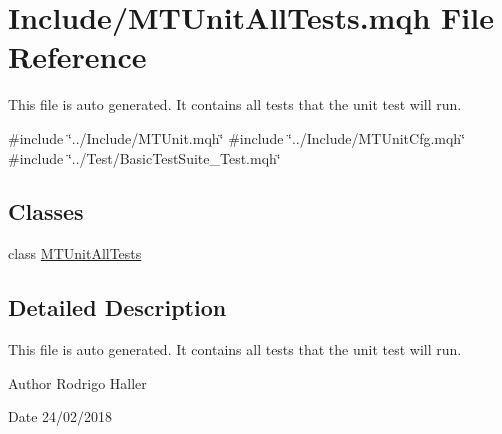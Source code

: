 \hypertarget{_m_t_unit_all_tests_8mqh}{}\section{Include/\+M\+T\+Unit\+All\+Tests.mqh File Reference}
\label{_m_t_unit_all_tests_8mqh}


This file is auto generated. It contains all tests that the unit test will run.  


{\ttfamily \#include \char`\"{}../\+Include/\+M\+T\+Unit.\+mqh\char`\"{}}\newline
{\ttfamily \#include \char`\"{}../\+Include/\+M\+T\+Unit\+Cfg.\+mqh\char`\"{}}\newline
{\ttfamily \#include \char`\"{}../\+Test/\+Basic\+Test\+Suite\+\_\+\+Test.\+mqh\char`\"{}}\newline
\subsection*{Classes}
\begin{DoxyCompactItemize}
\item 
class \mbox{\hyperlink{class_m_t_unit_all_tests}{M\+T\+Unit\+All\+Tests}}
\end{DoxyCompactItemize}


\subsection{Detailed Description}
This file is auto generated. It contains all tests that the unit test will run. 

\begin{DoxyAuthor}{Author}
Rodrigo Haller 
\end{DoxyAuthor}
\begin{DoxyDate}{Date}
24/02/2018 
\end{DoxyDate}

